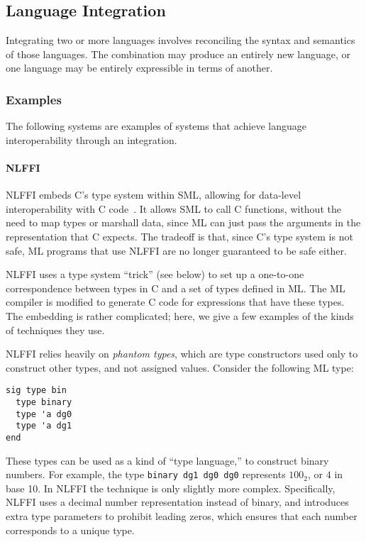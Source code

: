 
\subsection{Language Integration}
\label{embedded}

Integrating two or more languages involves reconciling the syntax and semantics of those languages. The combination may produce an entirely new language, or one language may be entirely expressible in terms of another.

\subsubsection{Examples}

The following systems are examples of systems that achieve language interoperability through an integration.

\paragraph{NLFFI}
\label{nlffi}

NLFFI embeds C's type system within SML, allowing for data-level interoperability with C code~\cite{blume01nlffi}. It allows SML to call C functions, without the need to map types or marshall data, since ML can just pass the arguments in the representation that C expects. The tradeoff is that, since C's type system is not safe, ML programs that use NLFFI are no longer guaranteed to be safe either.

NLFFI uses a type system ``trick'' (see below) to set up a one-to-one correspondence between types in C and a set of types defined in ML. The ML compiler is modified to generate C code for expressions that have these types. The embedding is rather complicated; here, we give a few examples of the kinds of techniques they use.

NLFFI relies heavily on \emph{phantom types}, which are type constructors used only to construct other types, and not assigned values. Consider the following ML type:

\begin{verbatim}
sig type bin
  type binary
  type 'a dg0
  type 'a dg1
end
\end{verbatim}

These types can be used as a kind of ``type language,'' to construct binary numbers. For example, the type \texttt{binary dg1 dg0 dg0} represents $100_2$, or $4$ in base 10. In NLFFI the technique is only slightly more complex. Specifically, NLFFI uses a decimal number representation instead of binary, and introduces extra type parameters to prohibit leading zeros, which ensures that each number corresponds to a unique type.

